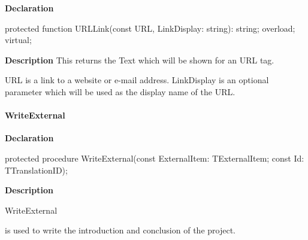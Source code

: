 \documentclass{report}
\newif\ifpdf
\begin{document}
\label{PasDoc_Gen.TDocGenerator-URLLink}
\begin{list}{}{
\setlength{\itemindent}{0cm}
\setlength{\listparindent}{0cm}
\setlength{\leftmargin}{\evensidemargin}
\addtolength{\leftmargin}{\tmplength}
\settowidth{\labelsep}{X}
\addtolength{\leftmargin}{\labelsep}
\setlength{\labelwidth}{\tmplength}
}
\item[\textbf{Declaration}\hfill]
\ifpdf
\begin{flushleft}
\fi
\begin{ttfamily}
protected function URLLink(const URL, LinkDisplay: string): string; overload; virtual;\end{ttfamily}

\ifpdf
\end{flushleft}
\fi

\par
\item[\textbf{Description}]
This returns the Text which will be shown for an URL tag.

URL is a link to a website or e{-}mail address. LinkDisplay is an optional parameter which will be used as the display name of the URL.

\end{list}
\paragraph*{WriteExternal}\hspace*{\fill}

\label{PasDoc_Gen.TDocGenerator-WriteExternal}
\begin{list}{}{
\setlength{\itemindent}{0cm}
\setlength{\listparindent}{0cm}
\setlength{\leftmargin}{\evensidemargin}
\addtolength{\leftmargin}{\tmplength}
\settowidth{\labelsep}{X}
\addtolength{\leftmargin}{\labelsep}
\setlength{\labelwidth}{\tmplength}
}
\item[\textbf{Declaration}\hfill]
\ifpdf
\begin{flushleft}
\fi
\begin{ttfamily}
protected procedure WriteExternal(const ExternalItem: TExternalItem; const Id: TTranslationID);\end{ttfamily}

\ifpdf
\end{flushleft}
\fi

\par
\item[\textbf{Description}]
\begin{ttfamily}WriteExternal\end{ttfamily} is used to write the introduction and conclusion of the project.

\end{list}
\end{document}
